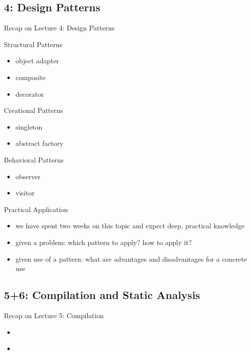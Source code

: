 \subsection{4: Design Patterns}
\begin{frame}{Recap on Lecture 4: Design Patterns}
	\begin{fancycolumns}
		\begin{note}{Structural Patterns}
			\begin{itemize}
				\item object adapter
				\item composite
				\item decorator
			\end{itemize}
		\end{note}
	\nextcolumn
		\begin{note}{Creational Patterns}
			\begin{itemize}
				\item singleton
				\item abstract factory
			\end{itemize}
		\end{note}
		\begin{note}{Behavioral Patterns}
			\begin{itemize}
				\item observer
				\item visitor
			\end{itemize}
		\end{note}
	\end{fancycolumns}
	\begin{example}{Practical Application}
		\begin{itemize}
			\item we have spent two weeks on this topic and expect deep, practical knowledge
			\item given a problem: which pattern to apply? how to apply it?
			\item given use of a pattern: what are advantages and disadvantages for a concrete use
		\end{itemize}
	\end{example}
\end{frame}

\subsection{5+6: Compilation and Static Analysis}
\begin{frame}{Recap on Lecture 5: Compilation}
	\begin{fancycolumns}
		\begin{note}{}
			\begin{itemize}
				\item 
			\end{itemize}
		\end{note}
		\nextcolumn
		\begin{note}{}
			\begin{itemize}
				\item 
			\end{itemize}
		\end{note}
	\end{fancycolumns}
\end{frame}


